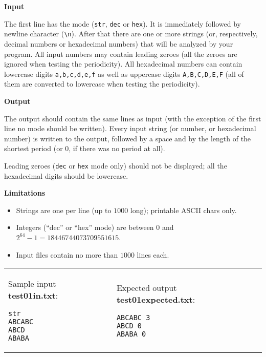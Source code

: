 \documentclass[11pt]{article}
\begin{document}
{\bf Input}

The first line has the mode ({\tt str}, {\tt dec} or {\tt hex}). It is immediately 
followed by newline character ({\tt \textbackslash{}n}).
After that there are one or more strings (or, respectively, decimal numbers or hexadecimal numbers) 
that will be analyzed by your program. 
All input numbers may contain leading zeroes (all the zeroes are ignored when testing the periodicity). 
All hexadecimal numbers can contain lowercase
digits {\tt a,b,c,d,e,f} as well as uppercase digits {\tt A,B,C,D,E,F} (all of them are converted
to lowercase when testing the periodicity).

{\bf Output}

The output should contain the same lines as input (with the exception of the first line \textendash{} no mode
should be written). Every input string (or number, or hexadecimal number) is written to the output, followed
by a space and by the length of the shortest period (or $0$, if there was no period at all). 

Leading zeroes ({\tt dec} or {\tt hex} mode only) should not be displayed; all the hexadecimal digits should be lowercase.

{\bf Limitations}

\begin{itemize}
\item Strings are one per line (up to $1000$ long); printable ASCII chars only.
\item Integers (``dec'' or ``hex'' mode) are between $0$ and $2^{64} - 1 = 18446744073709551615$. 
\item Input files contain no more than $1000$ lines each.
\end{itemize}



\begin{tabular}{@{}ll@{}}
\begin{minipage}[t]{0.49\columnwidth}
Sample input {\bf test01in.txt}:
\begin{verbatim}
str
ABCABC
ABCD
ABABA
\end{verbatim}
\end{minipage} 
&
\begin{minipage}[t]{0.49\columnwidth}
Expected output {\bf test01expected.txt}:
\begin{verbatim}
ABCABC 3
ABCD 0
ABABA 0
\end{verbatim}
\end{minipage} 
\end{tabular}
\end{document}
